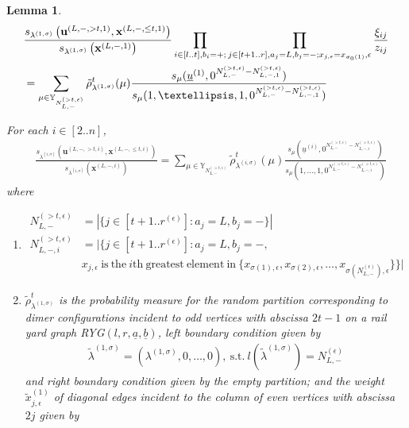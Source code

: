 \documentclass[11pt]{amsart}
\theoremstyle{plain}
\newtheorem{lemma}[theorem]{Lemma}
\theoremstyle{definition}
\theoremstyle{remark}
\newcommand\si{\sigma}
\newcommand\YY{\mathbb{Y}}
\numberwithin{equation}{section}
\numberwithin{theorem}{section}
\numberwithin{figure}{section}
\begin{document}
\begin{lemma}\label{l46}
\begin{align}
&\frac{s_{\lambda^{(1,\sigma)}}\left(\mathbf{u}^{(L,-,>t,1)},\mathbf{x}^{(L,-,\leq t,1)}\right)}{s_{\lambda^{(1,\sigma)}}\left(\mathbf{x}^{(L,-,1)}\right)}
\prod_{i\in[l..t],b_i=+;}\prod_{j\in[t+1..r],a_j=L,b_j=-;x_{j,\epsilon}=x_{\si_0(1)},\epsilon}\frac{\xi_{ij}}{z_{ij}}\label{e461}\\
&=\sum_{\mu\in \YY_{N_{L,-}^{(>t,\epsilon)}}}\tilde{\rho}^t_{\lambda^{(1,\si)}}(\mu)
\frac{s_{\mu}(\underline{u}^{(1)},0^{N_{L,-}^{(>t,\epsilon)}-N_{L,-,1}^{(>t,\epsilon)}})}{s_{\mu}(1,\ldots,1,0^{N_{L,-}^{(>t,\epsilon)}-N_{L,-,1}^{(>t,\epsilon)}})}\notag
\end{align}

For each $i\in[2..n]$,
\begin{align}
&\frac{s_{\lambda^{(i,\sigma)}}\left(\mathbf{u}^{(L,-,>t,i)},\mathbf{x}^{(L,-,\leq t,i)}\right)}{s_{\lambda^{(i,\sigma)}}\left(\mathbf{x}^{(L,-,i)}\right)}=\sum_{\mu\in\YY_{N_{L,-}^{(>t,\epsilon)}}}\tilde{\rho}^{t}_{\lambda^{(i,\si)}}(\mu)\frac{s_{\mu}(\underline{u}^{(i)},0^{N_{L,-}^{(>t,\epsilon)}-N_{L,-,i}^{(>t,\epsilon)}})}{s_{\mu}(1,\ldots,1,0^{N_{L,-}^{(>t,\epsilon)}-N_{L,-,i}^{(>t,\epsilon)}})}\label{e462}
\end{align}
where  
\begin{enumerate}
\item 
\begin{align*}
N_{L,-}^{(>t,\epsilon)}&=|\{j\in [t+1..r^{(\epsilon)}]:a_j=L,b_j=-\}|\\
N_{L,-,i}^{(>t,\epsilon)}&=|\{j\in [t+1..r^{(\epsilon)}]:a_j=L,b_j=-,\\
&x_{j,\epsilon}\ \mathrm{is\ the}\ i\mathrm{th}\ \mathrm{greatest\ element\ in}\ \{x_{\si(1),\epsilon},x_{\si(2),\epsilon},\ldots,x_{\si(N_{L,-}^{(\epsilon)}),\epsilon}\}\}|
\end{align*}
\item $\tilde{\rho}^{t}_{\lambda^{(1,\si)}}$ is the probability measure for the random partition corresponding to dimer configurations incident to odd vertices with abscissa $2t-1$ on a rail yard graph RYG$(l,r,\underline{a},\underline{b})$, left boundary condition given by 
\begin{align*}
\tilde{\lambda}^{(1,\si)}=(\lambda^{(1,\si)},0,\ldots,0),\ \mathrm{s.t.}\ l(\tilde{\lambda}^{(1,\si)})=N_{L,-}^{(\epsilon
)}
\end{align*}
and right boundary condition given by the empty partition; and the weight $\tilde{x}_{j,\epsilon}^{(1)}$ of diagonal edges incident to the column of even vertices with abscissa $2j$ given by

\end{enumerate}
\end{lemma}
\end{document}
